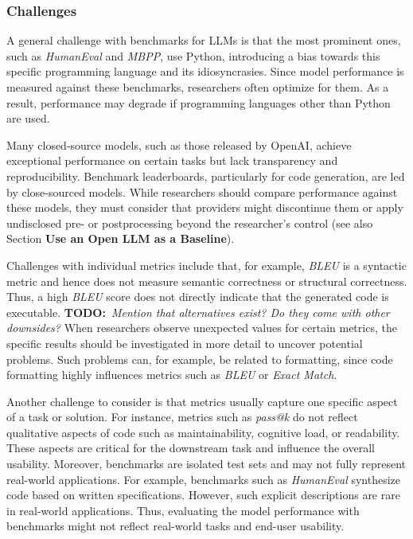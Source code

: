 \documentclass[11pt]{article}
\newcommand{\todo}[1]{{\textbf{TODO:}\ \textit{#1}}} %
\begin{document}

\subsubsection{Challenges}

A general challenge with benchmarks for LLMs is that the most prominent ones, such as \emph{HumanEval} and \emph{MBPP}, use Python, introducing a bias towards this specific programming language and its idiosyncrasies.
Since model performance is measured against these benchmarks, researchers often optimize for them.
As a result, performance may degrade if programming languages other than Python are used.

Many closed-source models, such as those released by OpenAI, achieve exceptional performance on certain tasks but lack transparency and reproducibility.
Benchmark leaderboards, particularly for code generation, are led by close-sourced models.
While researchers should compare performance against these models, they must consider that providers might discontinue them or apply undisclosed pre- or postprocessing beyond the researcher's control (see also Section \textbf{Use an Open LLM as a Baseline}).

Challenges with individual metrics include that, for example, \emph{BLEU} is a syntactic metric and hence does not measure semantic correctness or structural correctness.
Thus, a high \emph{BLEU} score does not directly indicate that the generated code is executable.
\todo{Mention that alternatives exist? Do they come with other downsides?}
When researchers observe unexpected values for certain metrics, the specific results should be investigated in more detail to uncover potential problems.
Such problems can, for example, be related to formatting, since code formatting highly influences metrics such as \emph{BLEU} or \emph{Exact Match}.

Another challenge to consider is that metrics usually capture one specific aspect of a task or solution.
For instance, metrics such as \emph{pass@k} do not reflect qualitative aspects of code such as maintainability, cognitive load, or readability.
These aspects are critical for the downstream task and influence the overall usability.
Moreover, benchmarks are isolated test sets and may not fully represent real-world applications.
For example, benchmarks such as \emph{HumanEval} synthesize code based on written specifications.
However, such explicit descriptions are rare in real-world applications.
Thus, evaluating the model performance with benchmarks might not reflect real-world tasks and end-user usability.
\end{document}
